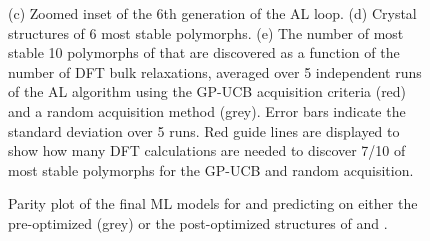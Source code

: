 \begin{figure}[!htb]
{%
(c) Zoomed inset of the 6th generation of the AL loop.
(d) Crystal structures of \num{6} most stable \IrOthree polymorphs.
(e) The number of most stable \num{10} polymorphs of \IrOthree that are discovered as a function of the number of DFT bulk relaxations, averaged over \num{5} independent runs of the AL algorithm using the GP-UCB acquisition criteria (red) and a random acquisition method (grey).
%
Error bars indicate the standard deviation over \num{5} runs.
%
Red guide lines are displayed to show how many DFT calculations are needed to discover \num{7/10} of most stable polymorphs for the GP-UCB and random acquisition.
}
\end{figure}


\begin{figure}[!htb]
\centering
{}
\caption{\label{fig:parity}
%
Parity plot of the final ML models for \IrOtwo and \IrOthree predicting on either the pre-optimized (grey) or the post-optimized structures of \IrOtwo and \IrOthree.
}
\end{figure}



